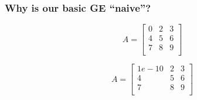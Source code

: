 \documentclass[10pt]{beamer}
\begin{document}
\begin{frame}
\frametitle{Why is our basic GE ``naive''?}
\begin{example}
\begin{equation*}
A=
\begin{bmatrix}
  0 & 2 & 3\\
  4 & 5 & 6\\
  7 & 8 & 9\\
\end{bmatrix}
\end{equation*}
\end{example}
\begin{example}
\begin{equation*}
A=
\begin{bmatrix}
  1e-10 & 2 & 3\\
  4 & 5 & 6\\
  7 & 8 & 9\\
\end{bmatrix}
\end{equation*}
\end{example}

\end{frame}
\end{document}
